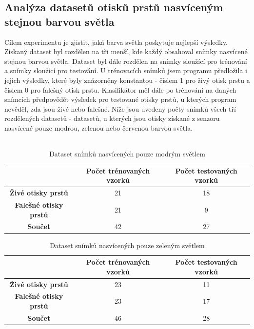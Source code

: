 \subsection{Analýza datasetů otisků prstů nasvíceným stejnou barvou světla}
Cílem experimentu je zjistit, jaká barva světla poskytuje nejlepší výsledky. Získaný dataset byl rozdělen na tři menší, kde každý obsahoval snímky nasvícené stejnou barvou světla. Dataset byl dále rozdělen na snímky sloužící pro trénování a snímky sloužící pro testování. U trénovacích snímků jsem programu předložila i jejich výsledky, které byly znázorněny konstantou - číslem 1 pro živý otisk prstu a číslem 0 pro falešný otisk prstu. Klasifikátor měl dále po trénování na daných snímcích předpovědět výsledek pro testované otisky prstů, u kterých program nevěděl, zda jsou živé nebo falešné. Níže jsou uvedeny počty snímků všech tří rozdělených datasetů - datasetů, u kterých jsou otisky získané z senzoru nasvícené pouze modrou, zelenou nebo červenou barvou světla. \\\

\capstartfalse
\begin{table}[!htbp]
\centering
\begin{tabular}{|c|c|c|}
\hline
\textbf{}                     & \textbf{Počet trénovaných vzorků} & \textbf{Počet testovaných vzorků} \\ \hline
\textbf{Živé otisky prstů}    & 21                                & 18                                \\ \hline
\textbf{Falešné otisky prstů} & 21                                & 9                                \\ \hline
\textbf{Součet}               & 42                                & 27                                \\ \hline
\end{tabular}
\caption{Dataset snímků nasvícených pouze modrým světlem}
\end{table}
\capstarttrue

\capstartfalse
\begin{table}[!htbp]
\centering
\begin{tabular}{|c|c|c|}
\hline
\textbf{}                     & \textbf{Počet trénovaných vzorků} & \textbf{Počet testovaných vzorků} \\ \hline
\textbf{Živé otisky prstů}    & 23                                & 11                                \\ \hline
\textbf{Falešné otisky prstů} & 23                                & 17                                \\ \hline
\textbf{Součet}               & 46                                & 28                                \\ \hline
\end{tabular}
\caption{Dataset snímků nasvícených pouze zeleným světlem}
\end{table}
\capstarttrue

